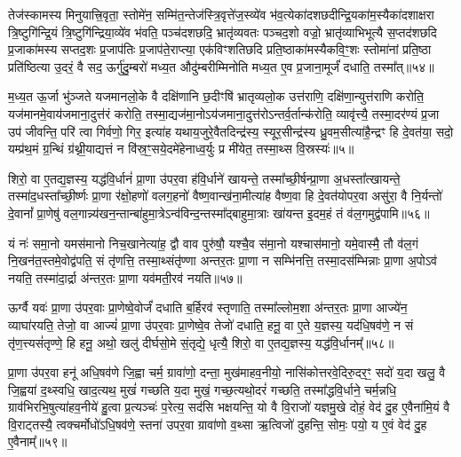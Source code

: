 तेज॑स्कामस्य मिनुयात्त्रि॒वृता॒ स्तोमे॑न॒ सम्मि॑त॒न्तेज॑स्त्रि॒वृत्ते॑ज॒स्व्ये॑व भ॑व॒त्येका॑दशछदीन्द्रि॒यका॑म॒स्यैका॑दशाक्षरा त्रि॒ष्टुगि॑न्द्रि॒यं त्रि॒ष्टुगि॑न्द्रिया॒व्ये॑व भ॑वति॒ पञ्च॑दशछदि॒ भ्रातृ॑व्यवतः पञ्चद॒शो वज्रो॒ भ्रातृ॑व्याभिभूत्यै स॒प्तद॑शछदि प्र॒जाका॑मस्य सप्तद॒शः प्र॒जाप॑तिः प्र॒जाप॑ते॒राप्त्या॒ एक॑विꣳशतिछदि प्रति॒ष्ठाका॑मस्यैकवि॒ꣳ॒शः स्तोमा॑नां प्रति॒ष्ठा प्रति॑ष्ठित्या उ॒दरं॒ वै सद॒ ऊर्गु॑दु॒म्बरो॑ मध्य॒त औदु॑म्बरीम्मिनोति मध्य॒त ए॒व प्र॒जाना॒मूर्जं॑ दधाति॒ तस्मा᳚त्॥५४॥

म॒ध्य॒त ऊ॒र्जा भु॑ञ्जते यजमानलो॒के वै दक्षि॑णानि छ॒दीꣳषि॑ भ्रातृव्यलो॒क उत्त॑राणि॒ दक्षि॑णा॒न्युत्त॑राणि करोति॒ यज॑मानमे॒वाय॑जमाना॒दुत्त॑रं करोति॒ तस्मा॒द्यज॑मा॒नो\-ऽय॑जमाना॒दुत्त॑रो\-ऽन्तर्व॒र्तान्क॑रोति॒ व्यावृ॑त्त्यै॒ तस्मा॒दर॑ण्यं प्र॒जा उप॑ जीवन्ति॒ परि॑ त्वा गिर्वणो॒ गिर॒ इत्या॑ह यथाय॒जुरे॒वैतदिन्द्र॑स्य॒ स्यूर॒सीन्द्र॑स्य ध्रु॒वम॒सीत्या॑है॒न्द्रꣳ हि दे॒वत॑या॒ सदो॒ यम्प्र॑थ॒मं ग्र॒न्थिं ग्र॑थ्नी॒याद्यत्तं न वि॑स्र॒ꣳ॒सये॒दमे॑हेनाध्व॒र्युः प्र मी॑येत॒ तस्मा॒थ्स वि॒स्रस्यः॑॥५॥

{\anuvakamend[{अप॑हत्यै॒ तस्मा᳚त्पितृदेव॒त्य॑न्तेनै॒व नव॑छदि॒ तस्मा॒थ्सदः॒ पञ्च॑दश च॥10॥}]}

शिरो॒ वा ए॒तद्य॒ज्ञस्य॒ यद्ध॑वि॒र्धानं॑ प्रा॒णा उ॑पर॒वा ह॑वि॒र्धाने॑ खायन्ते॒ तस्मा᳚च्छी॒र्\mbox{}षन्प्रा॒णा अ॒धस्ता᳚त्खायन्ते॒ तस्मा॑द॒धस्ता᳚च्छी॒र्ष्णः प्रा॒णा र॑क्षो॒हणो॑ वलग॒हनो॑ वैष्ण॒वान्ख॑ना॒मीत्या॑ह वैष्ण॒वा हि दे॒वत॑योपर॒वा असु॑रा॒ वै नि॒र्यन्तो॑ दे॒वानां᳚ प्रा॒णेषु॑ वल॒गान्न्य॑खन॒न्तान्बा॑हुमा॒त्रे\-ऽन्व॑विन्द॒न्तस्मा᳚द्बाहुमा॒त्राः खा॑यन्त इ॒दम॒हं तं व॑ल॒गमुद्व॑पामि॥५६॥

यं नः॑ समा॒नो यमस॑मानो निच॒खानेत्या॑ह॒ द्वौ वाव पुरु॑षौ॒ यश्चै॒व स॑मा॒नो यश्चास॑मानो॒ यमे॒वास्मै॒ तौ व॑ल॒गं नि॒खन॑त॒स्तमे॒वोद्व॑पति॒ सं तृ॑णत्ति॒ तस्मा॒थ्संतृ॑ण्णा अन्तर॒तः प्रा॒णा न सम्भि॑नत्ति॒ तस्मा॒दस॑म्भिन्नाः प्रा॒णा अ॒पो\-ऽव॑ नयति॒ तस्मा॑दा॒र्द्रा अ॑न्तर॒तः प्रा॒णा यव॑मती॒रव॑ नयति॥५७॥

ऊर्ग्वै यवः॑ प्रा॒णा उ॑पर॒वाः प्रा॒णेष्वे॒वोर्जं॑ दधाति ब॒र्\mbox{}हिरव॑ स्तृणाति॒ तस्मा᳚ल्लोम॒शा अ॑न्तर॒तः प्रा॒णा आज्ये॑न॒ व्याघा॑रयति॒ तेजो॒ वा आज्यं॑ प्रा॒णा उ॑पर॒वाः प्रा॒णेष्वे॒व तेजो॑ दधाति॒ हनू॒ वा ए॒ते य॒ज्ञस्य॒ यद॑धि॒षव॑णे॒ न सं तृ॑ण॒त्त्यसं॑तृण्णे॒ हि हनू॒ अथो॒ खलु॑ दीर्घसो॒मे सं॒तृद्ये॒ धृत्यै॒ शिरो॒ वा ए॒तद्य॒ज्ञस्य॒ यद्ध॑वि॒र्धानम्᳚॥५८॥

प्रा॒णा उ॑पर॒वा हनू॑ अधि॒षव॑णे जि॒ह्वा चर्म॒ ग्रावा॑णो॒ दन्ता॒ मुख॑माहव॒नीयो॒ नासि॑कोत्तरवे॒दिरु॒दर॒ꣳ॒ सदो॑ य॒दा खलु॒ वै जि॒ह्वया॑ द॒थ्स्वधि॒ खाद॒त्यथ॒ मुखं॑ गच्छति य॒दा मुखं॒ गच्छ॒त्यथो॒दरं॑ गच्छति॒ तस्मा᳚द्धवि॒र्धाने॒ चर्म॒न्नधि॒ ग्राव॑भिरभि॒षुत्या॑हव॒नीये॑ हु॒त्वा प्र॒त्यञ्चः॑ प॒रेत्य॒ सद॑सि भक्षयन्ति॒ यो वै वि॒राजो॑ यज्ञमु॒खे दोहं॒ वेद॑ दु॒ह ए॒वैना॑मि॒यं वै वि॒राट्तस्यै॒ त्वक्चर्मोधो॑\-ऽधि॒षव॑णे॒ स्तना॑ उपर॒वा ग्रावा॑णो व॒थ्सा ऋ॒त्विजो॑ दुहन्ति॒ सोमः॒ पयो॒ य ए॒वं वेद॑ दु॒ह ए॒वैनाम्᳚॥५९॥

